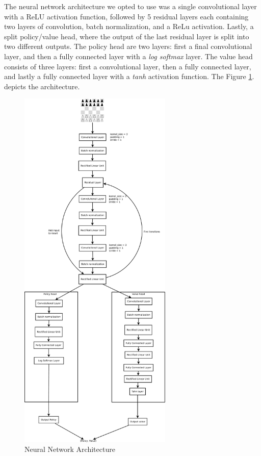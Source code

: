 The neural network architecture we opted to use was a single convolutional layer with a ReLU activation function, followed by 5 residual layers each containing two layers of convolution, batch normalization, and a ReLu activation. Lastly, a split policy/value head, where the output of the last residual layer is split into two different outputs. The policy head are two layers: first a final convolutional layer, and then a fully connected layer with a \textit{log softmax} layer. The value head consists of three layers: first a convolutional layer, then a fully connected layer, and lastly a fully connected layer with a \textit{tanh} activation function. The Figure \ref{fig:nnarch}. depicts the architecture.

\begin{figure}[]
    \centering

    \includegraphics[width=0.65\textwidth]{graphics/test}
    
    \caption{Neural Network Architecture}
    \label{fig:nnarch}
\end{figure}

